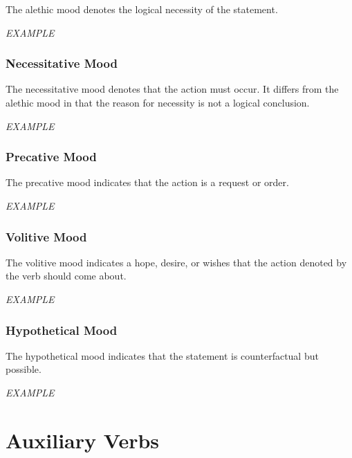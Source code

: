 \documentclass[grammar]{subfiles}
\begin{document}
	The alethic mood denotes the logical necessity of the statement.

	\begin{exe}
		\ex \emph{EXAMPLE}
	\end{exe}

	\subsubsection{Necessitative Mood}
	\label{sssec:vm_necessitative}

	The necessitative mood denotes that the action must occur. It differs from the alethic mood in that the reason for necessity is not a logical conclusion.

	\begin{exe}
		\ex \emph{EXAMPLE}
	\end{exe}

	\subsubsection{Precative Mood}
	\label{sssec:vm_precative}

	The precative mood indicates that the action is a request or order.

	\begin{exe}
		\ex \emph{EXAMPLE}
	\end{exe}

	\subsubsection{Volitive Mood}
	\label{sssec:vm_optative}

	The volitive mood indicates a hope, desire, or wishes that the action denoted by the verb should come about.

	\begin{exe}
		\ex \emph{EXAMPLE}
	\end{exe}

	\subsubsection{Hypothetical Mood}
	\label{sssec:vm_hypothetical}

	The hypothetical mood indicates that the statement is counterfactual but possible.

	\begin{exe}
		\ex \emph{EXAMPLE}
	\end{exe}


	\section{Auxiliary Verbs}
	\label{sec:vm_auxiliary}
	
\end{document}
